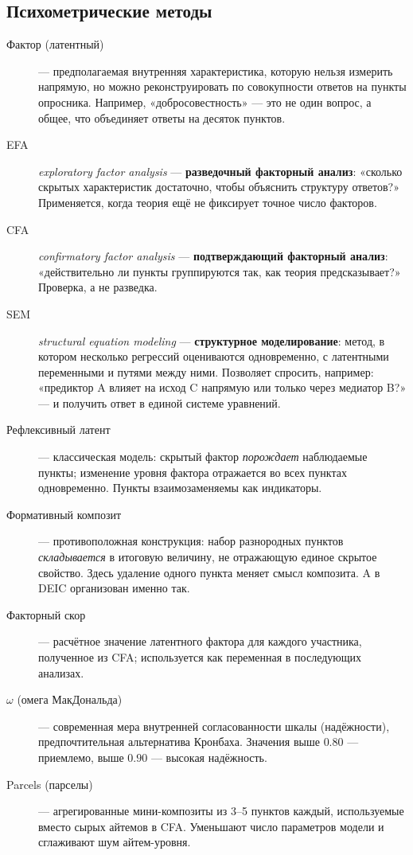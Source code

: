 \subsection*{Психометрические методы}

\begin{description}
    \item[Фактор (латентный)] --- предполагаемая внутренняя характеристика, которую нельзя измерить напрямую, но можно реконструировать по совокупности ответов на пункты опросника. Например, «добросовестность» --- это не один вопрос, а общее, что объединяет ответы на десяток пунктов.
    \item[EFA] \textit{exploratory factor analysis} --- \textbf{разведочный факторный анализ}: «сколько скрытых характеристик достаточно, чтобы объяснить структуру ответов?» Применяется, когда теория ещё не фиксирует точное число факторов.
    \item[CFA] \textit{confirmatory factor analysis} --- \textbf{подтверждающий факторный анализ}: «действительно ли пункты группируются так, как теория предсказывает?» Проверка, а не разведка.
    \item[SEM] \textit{structural equation modeling} --- \textbf{структурное моделирование}: метод, в котором несколько регрессий оцениваются одновременно, с латентными переменными и путями между ними. Позволяет спросить, например: «предиктор A влияет на исход C напрямую или только через медиатор B?» --- и получить ответ в единой системе уравнений.
    \item[Рефлексивный латент] --- классическая модель: скрытый фактор \emph{порождает} наблюдаемые пункты; изменение уровня фактора отражается во всех пунктах одновременно. Пункты взаимозаменяемы как индикаторы.
    \item[Формативный композит] --- противоположная конструкция: набор разнородных пунктов \emph{складывается} в итоговую величину, не отражающую единое скрытое свойство. Здесь удаление одного пункта меняет смысл композита. A в DEIC организован именно так.
    \item[Факторный скор] --- расчётное значение латентного фактора для каждого участника, полученное из CFA; используется как переменная в последующих анализах.
    \item[$\omega$ (омега МакДональда)] --- современная мера внутренней согласованности шкалы (надёжности), предпочтительная альтернатива Кронбаха. Значения выше $0.80$ --- приемлемо, выше $0.90$ --- высокая надёжность.
    \item[Parcels (парселы)] --- агрегированные мини-композиты из 3--5 пунктов каждый, используемые вместо сырых айтемов в CFA. Уменьшают число параметров модели и сглаживают шум айтем-уровня.

\end{description}
